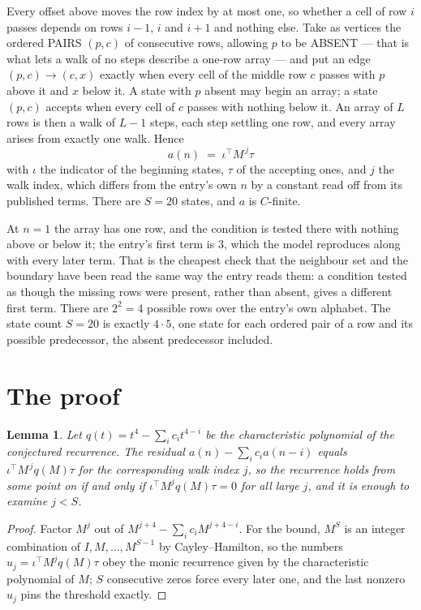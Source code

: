\documentclass[11pt,a4paper]{article}
\theoremstyle{plain}
\newtheorem{lemma}[theorem]{Lemma}
\theoremstyle{definition}
\begin{document}
Every offset above moves the row index by at most one, so whether a cell of row $i$ passes
depends on rows $i-1$, $i$ and $i+1$ and nothing else. Take as vertices the ordered PAIRS
$(p,c)$ of consecutive rows, allowing $p$ to be ABSENT --- that is what lets a walk of no steps
describe a one-row array --- and put an edge $(p,c)\to(c,x)$ exactly when every cell of the
middle row $c$ passes with $p$ above it and $x$ below it. A state with $p$ absent may begin an
array; a state $(p,c)$ accepts when every cell of $c$ passes with nothing below it. An array of
$L$ rows is then a walk of $L-1$ steps, each step settling one row, and every array arises from
exactly one walk. Hence
\[
a(n)\;=\;\iota^{\!\top}M^{\,j}\tau
\]
with $\iota$ the indicator of the beginning states, $\tau$ of the accepting ones, and $j$ the
walk index, which differs from the entry's own $n$ by a constant read off from its published
terms. There are $S=20$ states, and $a$ is $C$-finite.

At $n=1$ the array has one row, and
the condition is tested there with nothing above or below it; the entry's first term is
$3$, which the model reproduces along with every later term. That is the cheapest check
that the neighbour set and the boundary have been read the same way the entry reads them: a
condition tested as though the missing rows were present, rather than absent, gives a different
first term. There are $2^{2}=4$ possible rows over the entry's own alphabet. The state count $S=20$ is exactly $4\cdot5$,
one state for each ordered pair of a row and its possible predecessor, the absent predecessor
included.

\section{The proof}

\begin{lemma}\label{lem:crit}
Let $q(t)=t^{4}-\sum_i c_it^{4-i}$ be the characteristic polynomial of the
conjectured recurrence. The residual $a(n)-\sum_ic_ia(n-i)$ equals
$\iota^{\!\top}M^{\,j}q(M)\tau$ for the corresponding walk index $j$, so the recurrence
holds from some point on if and only if $\iota^{\!\top}M^{j}q(M)\tau=0$ for all large $j$,
and it is enough to examine $j<S$.
\end{lemma}

\begin{proof}
Factor $M^{j}$ out of $M^{j+4}-\sum_ic_iM^{j+4-i}$. For the bound, $M^{S}$
is an integer combination of $I,M,\dots,M^{S-1}$ by Cayley--Hamilton, so the numbers
$u_j=\iota^{\!\top}M^{j}q(M)\tau$ obey the monic recurrence given by the characteristic
polynomial of $M$; $S$ consecutive zeros force every later one, and the last nonzero $u_j$
pins the threshold exactly.
\end{proof}
\end{document}
